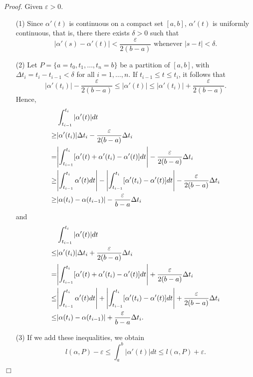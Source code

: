 \documentclass{article}
\begin{document}
\emph{Proof.}
Given $\varepsilon > 0$.
\begin{enumerate}
\item[(1)]
  Since $\alpha'(t)$ is continuous on a compact set $[a,b]$,
  $\alpha'(t)$ is uniformly continuous, that is,
  there there exists $\delta > 0$ such that
  \[
    |\alpha'(s) - \alpha'(t)| < \frac{\varepsilon}{2(b-a)}
    \text{ whenever } |s-t| < \delta.
  \]
\item[(2)]
  Let $P = \{a = t_0, t_1, \ldots, t_n = b \}$
  be a partition of $[a,b]$, with $\Delta t_i = t_i - t_{i-1} < \delta$
  for all $i = 1, \ldots, n$.
  If $t_{i-1} \leq t \leq t_i$, it follows that
  \[
    |\alpha'(t_i)| - \frac{\varepsilon}{2(b-a)}
    \leq |\alpha'(t)|
    \leq |\alpha'(t_i)| + \frac{\varepsilon}{2(b-a)}.
  \]
  Hence,
  \begin{align*}
    &\int_{t_{i-1}}^{t_i} |\alpha'(t)| dt \\
    \geq& |\alpha'(t_i)| \Delta t_i
      - \frac{\varepsilon}{2(b-a)} \Delta t_i \\
    =& \abs{ \int_{t_{i-1}}^{t_i} [\alpha'(t)+\alpha'(t_i)-\alpha'(t)] dt }
      - \frac{\varepsilon}{2(b-a)} \Delta t_i \\
    \geq& \abs{ \int_{t_{i-1}}^{t_i} \alpha'(t) dt }
      - \abs{ \int_{t_{i-1}}^{t_i} [\alpha'(t_i)-\alpha'(t)] dt }
      - \frac{\varepsilon}{2(b-a)} \Delta t_i \\
    \geq& \abs{ \alpha(t_i) - \alpha(t_{i-1}) }
      - \frac{\varepsilon}{b-a} \Delta t_i
  \end{align*}
  and
  \begin{align*}
    &\int_{t_{i-1}}^{t_i} |\alpha'(t)| dt \\
    \leq& |\alpha'(t_i)| \Delta t_i
      + \frac{\varepsilon}{2(b-a)} \Delta t_i \\
    =& \abs{ \int_{t_{i-1}}^{t_i} [\alpha'(t)+\alpha'(t_i)-\alpha'(t)] dt }
      + \frac{\varepsilon}{2(b-a)} \Delta t_i \\
    \leq& \abs{ \int_{t_{i-1}}^{t_i} \alpha'(t) dt }
      + \abs{ \int_{t_{i-1}}^{t_i} [\alpha'(t_i)-\alpha'(t)] dt }
      + \frac{\varepsilon}{2(b-a)} \Delta t_i \\
    \leq& \abs{ \alpha(t_i) - \alpha(t_{i-1}) }
      + \frac{\varepsilon}{b-a} \Delta t_i.
  \end{align*}

\item[(3)]
  If we add these inequalities, we obtain
  \[
    l(\alpha,P) - \varepsilon
    \leq \int_{a}^{b} |\alpha'(t)| dt
    \leq l(\alpha,P) + \varepsilon.
  \]
\end{enumerate}
$\Box$ \\\\
\end{document}

